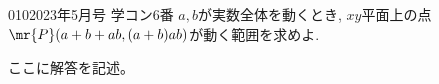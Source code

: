 \begin{prob}{010}{}{2023年5月号 学コン6番}
 $a,b$が実数全体を動くとき, $xy$平面上の点$\mr{P}(a+b+ab, (a+b)ab)$が動く範囲を求めよ.
\end{prob}

ここに解答を記述。
